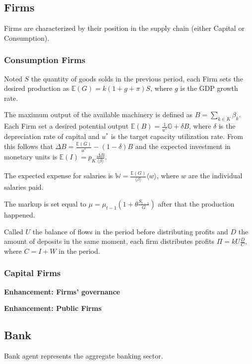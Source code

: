 \documentclass[a4paper, headings=standardclasses]{scrartcl}
\newenvironment{enh}[1][]{\begin{framed}\noindent\textbf{Enhancement: #1}\par}{\end{framed}}
\begin{document}
\subsection{Firms}
Firms are characterized by their position in the supply chain (either Capital or Consumption).

\subsubsection{Consumption Firms}
Noted $S$ the quantity of goods solds in the previous period, each Firm sets the desired production as $\mathbb{E}(G) = k(1+g+\pi)S$, where $g$ is the GDP growth rate.

The maximum output of the available machinery is defined as $B = \sum_{k \in K} \beta_k$. Each Firm set a desired potential output $\mathbb{E}(B) = \frac{1}{u^*}\mathbb{G} + \delta B$, where $\delta$ is the depreciation rate of capital and $u^*$ is the target capacity utilization rate. From this follows that $\Delta B = \frac{\mathbb{E}(G)}{u^*} - (1 - \delta) B$ and the expected investment in monetary units is $\mathbb{E}(I) = p_K\frac{\Delta B}{\langle \beta \rangle}$.

The expected expense for salaries is $\mathbb{W} = \frac{\mathbb{E}(G)}{\langle \beta \rangle}\langle w \rangle$, where $w$ are the individual salaries paid.

The markup is set equal to $\mu = \mu_{t-1}(1 + \theta \frac{S_{t-1}}{G})$ after that the production happened.

Called $U$ the balance of flows in the period before distributing profits and $D$ the amount of deposits in the same moment, each firm distributes profits $\Pi = k U \frac{D}{C}$, where $C = I + W$ in the period.


\subsubsection{Capital Firms}



\begin{enh}[Firms' governance]

\end{enh}

\begin{enh}[Public Firms]
\end{enh}


\subsection{Bank}
Bank agent represents the aggregate banking sector.
\end{document}
